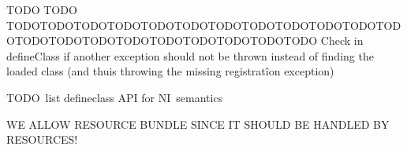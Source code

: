TODO TODO TODOTODOTODOTODOTODOTODOTODOTODOTODOTODOTODOTODOTODOTODOTODOTODOTODOTODOTODOTODOTODO
Check in defineClass if another exception should not be thrown instead of finding the loaded class (and thuis throwing the missing registratîon exception)

TODO list defineclass API for NI semantics


WE ALLOW RESOURCE BUNDLE SINCE IT SHOULD BE HANDLED BY RESOURCES!